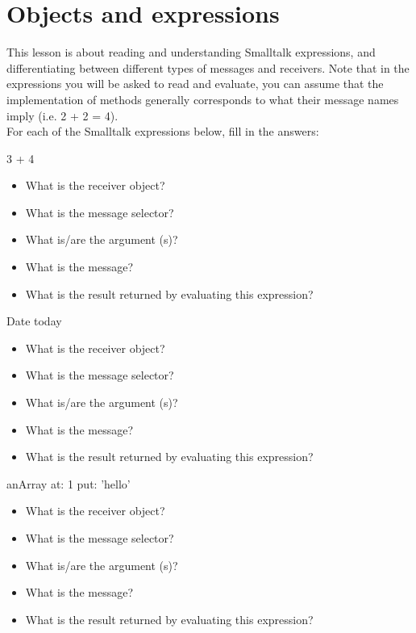 \ifx\wholebook\relax\else


\fi


\chapter{Objects and expressions}

This lesson is about reading and understanding Smalltalk
expressions, and differentiating between different types of
messages and receivers. Note that in the expressions you will be
asked to read and evaluate, you can assume that the implementation
of methods generally corresponds to what their message names imply
(i.e. 2 + 2 = 4). \\
\exercise For each of the Smalltalk
expressions below, fill in the answers:

\begin{code}
3 + 4
\end{code}
\begin{itemize}
\item What is the receiver object?
\item What is the message selector?
\item What is/are the argument (s)?
\item What is the message?
\item What is the result returned by evaluating this expression?
\end{itemize}

\begin{code}
Date today
\end{code}
\begin{itemize}
\item What is the receiver object?
\item What is the message selector?
\item What is/are the argument (s)?
\item What is the message?
\item What is the result returned by evaluating this expression?
\end{itemize}

\begin{code}
anArray at: 1 put: 'hello'
\end{code}

\begin{itemize}
\item What is the receiver object?
\item What is the message selector?
\item What is/are the argument (s)?
\item What is the message?
\item What is the result returned by evaluating this expression?
\end{itemize}

